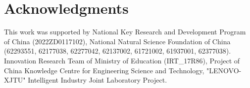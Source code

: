 \documentclass[letterpaper]{article} %
\begin{document}
\section*{Acknowledgments}
This work was supported by National Key Research and Development Program of China (2022ZD0117102), National Natural Science Foundation of China (62293551, 62177038, 62277042, 62137002, 61721002, 61937001, 62377038). Innovation Research Team of Ministry of Education (IRT\_17R86), Project of China Knowledge Centre for Engineering Science and Technology, "LENOVO-XJTU" Intelligent Industry Joint Laboratory Project.




\end{document}
